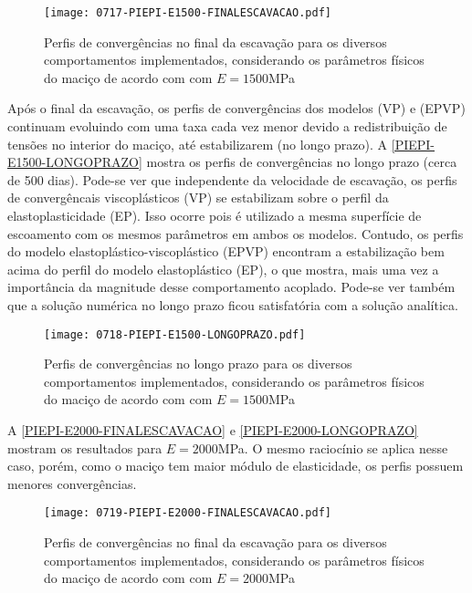 \begin{figure}[H]
	\begin{center}
		\texttt{[image: 0717-PIEPI-E1500-FINALESCAVACAO.pdf]}
	\end{center}
	\caption{\label{PIEPI-E1500-FINALESCAVACAO}Perfis de convergências no final da escavação para os diversos comportamentos implementados, considerando os parâmetros físicos do maciço de acordo com  com $E=1500$MPa}
\end{figure}

Após o final da escavação, os perfis de convergências dos modelos (VP) e (EPVP) continuam evoluindo com uma taxa cada vez menor devido a redistribuição de tensões no interior do maciço, até estabilizarem (no longo prazo). A \autoref{PIEPI-E1500-LONGOPRAZO} mostra os perfis de convergências no longo prazo (cerca de 500 dias). Pode-se ver que independente da velocidade de escavação, os perfis de convergêncais viscoplásticos (VP) se estabilizam sobre o perfil da elastoplasticidade (EP). Isso ocorre pois é utilizado a mesma superfície de escoamento com os mesmos parâmetros em ambos os modelos. Contudo, os perfis do modelo elastoplástico-viscoplástico (EPVP) encontram a estabilização bem acima do perfil do modelo elastoplástico (EP), o que mostra, mais uma vez a importância da magnitude desse comportamento acoplado. Pode-se ver também que a solução numérica no longo prazo ficou satisfatória com a solução analítica.

\begin{figure}[H]
	\begin{center}
		\texttt{[image: 0718-PIEPI-E1500-LONGOPRAZO.pdf]}
	\end{center}
	\caption{\label{PIEPI-E1500-LONGOPRAZO}Perfis de convergências no longo prazo para os diversos comportamentos implementados, considerando os parâmetros físicos do maciço de acordo com  com $E=1500$MPa}
\end{figure}

A \autoref{PIEPI-E2000-FINALESCAVACAO} e \autoref{PIEPI-E2000-LONGOPRAZO} mostram os resultados para $E=2000$MPa. O mesmo raciocínio se aplica nesse caso, porém, como o maciço tem maior módulo de elasticidade, os perfis possuem menores convergências.

\begin{figure}[H]
	\begin{center}
		\texttt{[image: 0719-PIEPI-E2000-FINALESCAVACAO.pdf]}
	\end{center}
	\caption{\label{PIEPI-E2000-FINALESCAVACAO}Perfis de convergências no final da escavação para os diversos comportamentos implementados, considerando os parâmetros físicos do maciço de acordo com  com $E=2000$MPa}
\end{figure}

